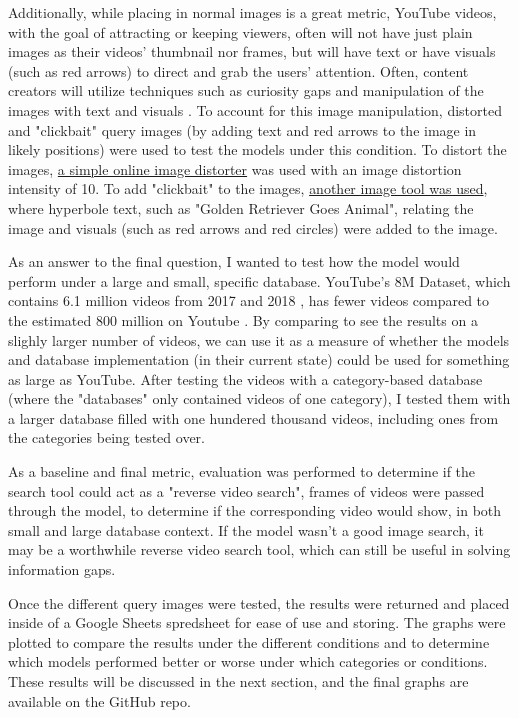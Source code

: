 \documentclass[10pt,twocolumn]{article}
\begin{document}
Additionally, while placing in normal images is a great metric, YouTube videos, with the goal of attracting or keeping viewers, often will not have just plain images as their videos' thumbnail nor frames, but will have text or have visuals (such as red arrows) to direct and grab the users' attention. Often, content creators will utilize techniques such as curiosity gaps and manipulation of the images with text and visuals \cite{Mowar2021}. To account for this image manipulation, distorted and "clickbait" query images (by adding text and red arrows to the image in likely positions) were used to test the models under this condition. To distort the images, \href{https://www.imgonline.com.ua/eng/picture-distortion.php}{a simple online image distorter} was used with an image distortion intensity of 10. To add "clickbait" to the images, \href{https://www.visualwatermark.com/add-text-to-photos/}{another image tool was used}, where hyperbole text, such as "Golden Retriever Goes Animal", relating the image and visuals (such as red arrows and red circles) were added to the image.

As an answer to the final question, I wanted to test how the model would perform under a large and small, specific database. YouTube’s 8M Dataset, which contains 6.1 million videos from 2017 and 2018 \cite{googleYT8M}, has fewer videos compared to the estimated 800 million on Youtube \cite{EarthWeb2022}. By comparing to see the results on a slighly larger number of videos, we can use it as a measure of whether the models and database implementation (in their current state) could be used for something as large as YouTube. After testing the videos with a category-based database (where the "databases" only contained videos of one category), I tested them with a larger database filled with one hundered thousand videos, including ones from the categories being tested over. 

As a baseline and final metric, evaluation was performed to determine if the search tool could act as a "reverse video search", frames of videos were passed through the model, to determine if the corresponding video would show, in both small and large database context. If the model wasn't a good image search, it may be a worthwhile reverse video search tool, which can still be useful in solving information gaps.

Once the different query images were tested, the results were returned and placed inside of a Google Sheets spredsheet for ease of use and storing. The graphs were plotted to compare the results under the different conditions and to determine which models performed better or worse under which categories or conditions. These results will be discussed in the next section, and the final graphs are available on the GitHub repo.
\end{document}
